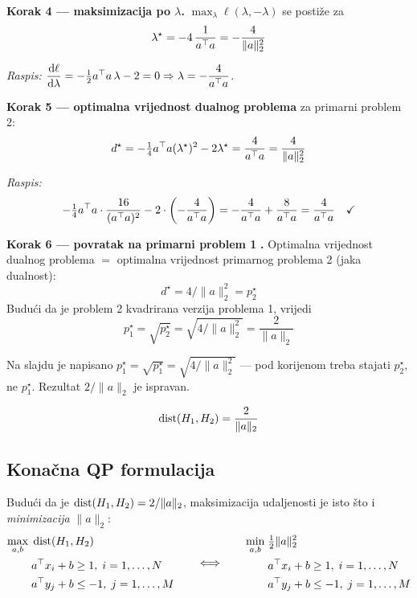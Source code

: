 \textbf{Korak 4 --- maksimizacija po $\lambda$.}
$\max_\lambda \ell(\lambda,-\lambda)$ se postiže za
\[
\lambda^\star = -4\,\frac{1}{a^{\top} a} = -\frac{4}{\|a\|_2^2}
\]

\emph{Raspis:} $\dfrac{\mathrm{d}\ell}{\mathrm{d}\lambda} = -\tfrac12 a^{\top} a\,\lambda - 2 = 0
\Rightarrow \lambda = -\dfrac{4}{a^{\top} a}$. \checkmark

\textbf{Korak 5 --- optimalna vrijednost dualnog problema} za primarni problem 2:
\[
d^\star = -\tfrac14 a^{\top} a(\lambda^\star)^2 - 2\lambda^\star
= \frac{4}{a^{\top} a} = \frac{4}{\|a\|_2^2}
\]

\emph{Raspis:}
\[
-\tfrac14 a^{\top} a\cdot\frac{16}{(a^{\top} a)^2} - 2\cdot\left(-\frac{4}{a^{\top} a}\right)
= -\frac{4}{a^{\top} a} + \frac{8}{a^{\top} a} = \frac{4}{a^{\top} a} \quad\checkmark
\]

\textbf{Korak 6 --- povratak na primarni problem 1} \textbf{.}
Optimalna vrijednost dualnog problema $=$ optimalna vrijednost primarnog
problema 2 (jaka dualnost):
\[
d^\star = 4/\|a\|_2^2 = p_2^\star
\]
Budući da je problem 2 kvadrirana verzija problema 1, vrijedi
\[
p_1^\star = \sqrt{p_2^\star} = \sqrt{4/\|a\|_2^2} = \frac{2}{\|a\|_2}
\]

\begin{napomena}
Na slajdu je napisano $p_1^\star = \sqrt{p_1^\star} = \sqrt{4/\|a\|_2^2}$ ---
pod korijenom treba stajati $p_2^\star$, ne $p_1^\star$. Rezultat
$2/\|a\|_2$ je ispravan.
\end{napomena}

\begin{teorem}[Margina]
\[
\operatorname{dist}(H_1, H_2) = \frac{2}{\|a\|_2}
\]
\end{teorem}

\subsection{Konačna QP formulacija}

Budući da je $\operatorname{dist}(H_1,H_2) = 2/\|a\|_2$, maksimizacija udaljenosti je isto
što i \emph{minimizacija} $\|a\|_2$:
\[
\begin{aligned}
\max_{a,b} \; & \operatorname{dist}(H_1,H_2) \\
& a^{\top} x_i + b \ge 1, \; i = 1,\dots,N \\
& a^{\top} y_j + b \le -1, \; j = 1,\dots,M
\end{aligned}
\qquad\Longleftrightarrow\qquad
\begin{aligned}
\min_{a,b} \; & \tfrac12\|a\|_2^2 \\
& a^{\top} x_i + b \ge 1, \; i = 1,\dots,N \\
& a^{\top} y_j + b \le -1, \; j = 1,\dots,M
\end{aligned}
\]


